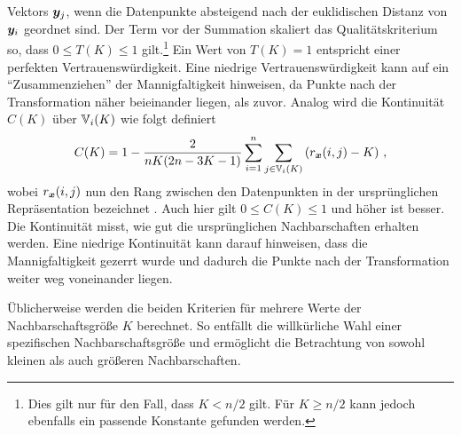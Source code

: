 Vektors $\bm{y}_j$, wenn die Datenpunkte absteigend nach der euklidischen Distanz von
$\bm{y}_i$ geordnet sind. Der Term vor der Summation skaliert das Qualitätskriterium so, dass $0
	\leq T(K) \leq 1$ gilt.\footnote{Dies gilt nur für den Fall, dass $K < n/2$ gilt. Für $K \geq n/2$
	kann jedoch ebenfalls ein passende Konstante gefunden werden.} Ein Wert von $T(K) = 1­$ entspricht
einer perfekten Vertrauenswürdigkeit. Eine niedrige Vertrauenswürdigkeit kann auf ein
\enquote{Zusammenziehen} der Mannigfaltigkeit hinweisen, da Punkte nach der Transformation näher
beieinander liegen, als zuvor. Analog wird die Kontinuität $C(K)$ über $\mathbb{V}_i(K)$ wie folgt
definiert
\begin{equation}
	C(K) = 1 - \frac{2}{nK(2n - 3K - 1)} \sum_{i = 1}^{n}\sum_{j \in \mathbb{V}_i(K) } \left( r_{\bm{x}}(i, j) - K \right) \, ,
\end{equation}
wobei $r_{\bm{x}}(i, j)$ nun den Rang zwischen den Datenpunkten in der ursprünglichen Repräsentation bezeichnet \parencite[487]{Venna.2001}. Auch hier gilt $0 \leq C(K) \leq 1$ und höher ist besser. Die Kontinuität
misst, wie gut die ursprünglichen Nachbarschaften erhalten werden. Eine niedrige Kontinuität kann
darauf hinweisen, dass die Mannigfaltigkeit gezerrt wurde und dadurch die Punkte nach der
Transformation weiter weg voneinander liegen.

Üblicherweise werden die beiden Kriterien für mehrere Werte der Nachbarschaftsgröße $K$ berechnet. So entfällt die willkürliche Wahl einer spezifischen Nachbarschaftsgröße und ermöglicht die Betrachtung von sowohl kleinen als auch größeren Nachbarschaften.

